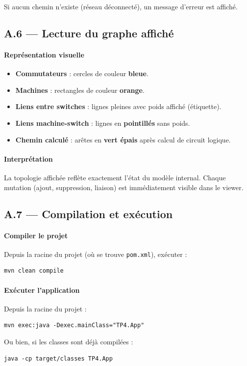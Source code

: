 \documentclass[12pt, a4paper]{article}
\begin{document}
Si aucun chemin n'existe (réseau déconnecté), un message d'erreur est affiché.

\subsection*{A.6 --- Lecture du graphe affiché}

\paragraph{Représentation visuelle}
\begin{itemize}
    \item \textbf{Commutateurs} : cercles de couleur \textbf{bleue}.
    \item \textbf{Machines} : rectangles de couleur \textbf{orange}.
    \item \textbf{Liens entre switches} : lignes pleines avec poids affiché (étiquette).
    \item \textbf{Liens machine-switch} : lignes en \textbf{pointillés} sans poids.
    \item \textbf{Chemin calculé} : arêtes en \textbf{vert épais} après calcul de circuit logique.
\end{itemize}

\paragraph{Interprétation}
La topologie affichée reflète exactement l'état du modèle internal. Chaque mutation (ajout, suppression, liaison) est immédiatement visible dans le viewer.

\subsection*{A.7 --- Compilation et exécution}

\paragraph{Compiler le projet}
Depuis la racine du projet (où se trouve \texttt{pom.xml}), exécuter :
\begin{verbatim}
mvn clean compile
\end{verbatim}

\paragraph{Exécuter l'application}
Depuis la racine du projet :
\begin{verbatim}
mvn exec:java -Dexec.mainClass="TP4.App"
\end{verbatim}

Ou bien, si les classes sont déjà compilées :
\begin{verbatim}
java -cp target/classes TP4.App
\end{verbatim}
\end{document}
